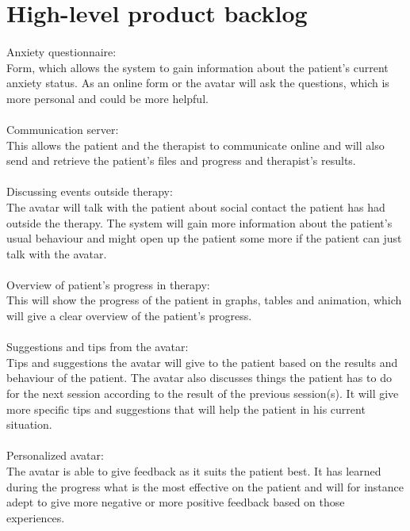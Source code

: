 \section{High-level product backlog}
\paragraph{}
Anxiety questionnaire: \\
Form, which allows the system to gain information about the patient's current anxiety status. As an online form or the avatar will ask the questions, which is more personal and could be more helpful.
\paragraph{}
Communication server: \\
This allows the patient and the therapist to communicate online and will also send and retrieve the patient's files and progress and therapist's results.
\paragraph{}
Discussing events outside therapy: \\
The avatar will talk with the patient about social contact the patient has had outside the therapy.
The system will gain more information about the patient's usual behaviour and might open up the patient some more if the patient can just talk with the avatar.
\paragraph{}
Overview of patient's progress in therapy: \\
This will show the progress of the patient in graphs, tables and animation, which will give a clear overview of the patient's progress. 
\paragraph{}
Suggestions and tips from the avatar: \\
Tips and suggestions the avatar will give to the patient based on the results and behaviour of the patient. 
The avatar also discusses things the patient has to do for the next session according to the result of the previous session(s). It will give more specific tips and suggestions that will help the patient in his current situation.
\paragraph{}
Personalized avatar: \\
The avatar is able to give feedback as it suits the patient best. It has learned during the progress what is the most effective on the patient and will for instance adept to give more negative or more positive feedback based on those experiences.
